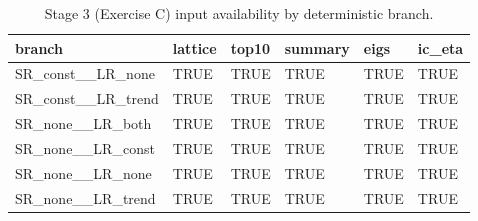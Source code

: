 \begin{table}[!h]
\centering
\caption{Stage 3 (Exercise C) input availability by deterministic branch.}
\centering
\begin{tabular}[t]{llllll}
\toprule
branch & lattice & top10 & summary & eigs & ic\_eta\\
\midrule
SR\_const\_\_LR\_none & TRUE & TRUE & TRUE & TRUE & TRUE\\
SR\_const\_\_LR\_trend & TRUE & TRUE & TRUE & TRUE & TRUE\\
SR\_none\_\_LR\_both & TRUE & TRUE & TRUE & TRUE & TRUE\\
SR\_none\_\_LR\_const & TRUE & TRUE & TRUE & TRUE & TRUE\\
SR\_none\_\_LR\_none & TRUE & TRUE & TRUE & TRUE & TRUE\\
\addlinespace
SR\_none\_\_LR\_trend & TRUE & TRUE & TRUE & TRUE & TRUE\\
\bottomrule
\end{tabular}
\end{table}
